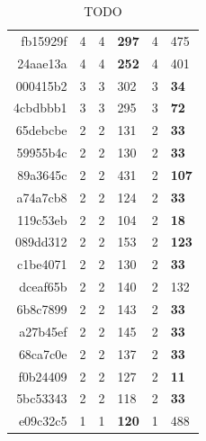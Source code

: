 \begin{table}
\begin{tabular}{r r | r l | r l }
        
        fb15929f &                  4 &            4    &  \textbf{297} & 4 & 475 \\ 
        24aae13a &                  4 &         4       &  \textbf{252 } & 4 & 401\\ 
        000415b2 &                  3 &         3       &  302 & 3 & \textbf{34}\\
        
        4cbdbbb1 &                  3 &          3      &  295 & 3 & \textbf{72}\\ 
        65debcbe &                  2 &          2      &  131  & 2 & \textbf{33} \\ 
        59955b4c &                  2 &          2      &  130  & 2 & \textbf{33}\\
        
        
        89a3645c &                  2 &           2     &  431 & 2 & \textbf{107}\\
        a74a7cb8 &                  2 &           2     &  124 & 2 & \textbf{33}\\
        119c53eb &                  2 &           2     &  104 & 2 & \textbf{18}\\
        
        089dd312 &                  2 &           2     &  153 & 2 & \textbf{123}\\
        c1be4071 &                  2 &           2     &  130 & 2 & \textbf{33}\\
        dceaf65b &                  2 &           2     &  140 & 2 & 132\\
        
        6b8c7899 &                  2 &            2    &  143 & 2 & \textbf{33}\\
        a27b45ef &                  2 &         2       &  145 & 2 & \textbf{33}\\
        68ca7c0e &                  2 &         2       &  137  & 2 & \textbf{33}\\
        
        f0b24409 &                  2 &         2       &  127  & 2 & \textbf{11}\\
        5bc53343 &                  2 &         2       &  118  & 2 & \textbf{33}\\
        e09c32c5 &                  1 &         1       &  \textbf{120}  & 1 & 488 \\
    \end{tabular}
    \caption{TODO}
    \label{offensive:results:fast}
\end{table}

